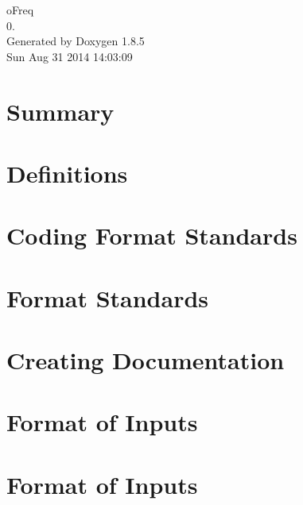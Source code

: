 \documentclass[twoside]{book}
\newcommand{\clearemptydoublepage}{%
  \newpage{\pagestyle{empty}\cleardoublepage}%
}
\begin{document}
\hypersetup{pageanchor=false}
\begin{titlepage}
\vspace*{7cm}
\begin{center}%
{\Large o\-Freq \\[1ex]\large 0. }\\
\vspace*{1cm}
{\large Generated by Doxygen 1.8.5}\\
\vspace*{0.5cm}
{\small Sun Aug 31 2014 14:03:09}\\
\end{center}
\end{titlepage}
\clearemptydoublepage
\tableofcontents
\clearemptydoublepage
{}
\hypersetup{pageanchor=true}

\chapter{Summary}
\label{index}\hypertarget{index}{}
\chapter{Definitions}
\label{definitions}
\hypertarget{definitions}{}

\chapter{Coding Format Standards}
\label{coding_standard}
\hypertarget{coding_standard}{}

\chapter{Format Standards}
\label{_coding}
\hypertarget{_coding}{}

\chapter{Creating Documentation}
\label{documentation}
\hypertarget{documentation}{}

\chapter{Format of Inputs}
\label{input_format}
\hypertarget{input_format}{}

\chapter{Format of Inputs}
\label{_input_formatting}
\hypertarget{_input_formatting}{}

\end{document}
